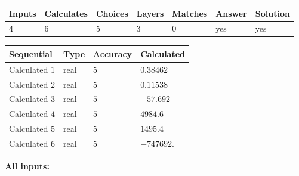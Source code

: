 \documentclass[12pt]{article}
\begin{document}
   
\noindent\begin{tabular}{|l|l|l|l|l|l|l|}
 \hline
Inputs & Calculates & Choices & Layers & Matches & Answer & Solution \\ \hline
           4  & 
           6  & 
           5
  & 
           3  & 
           0  & 
  yes & 
  yes 
  \\ \hline
 \end{tabular}
   
   
   
   
\noindent{}
   
   
  
  
\noindent\begin{tabular}{|l|l|l|l|}
\hline
 Sequential & Type & Accuracy & Calculated \\ 
\hline
 
 
  Calculated $            1 $ & real & $            5  $ & 
 $ 0.38462 $ 
 \\  \hline  
 
 
  Calculated $            2 $ & real & $            5  $ & 
 $ 0.11538 $ 
 \\  \hline  
 
 
  Calculated $            3 $ & real & $            5  $ & 
 $ -57.692 $ 
 \\  \hline  
 
 
  Calculated $            4 $ & real & $            5  $ & 
 $ 4984.6 $ 
 \\  \hline  
 
 
  Calculated $            5 $ & real & $            5  $ & 
 $ 1495.4 $ 
 \\  \hline  
 
 
  Calculated $            6 $ & real & $            5  $ & 
 $ -747692. $ 
 \\  \hline  
 \end{tabular}
   
   
   
   
\noindent\vspace{0.1in}\hspace{-0.08in} {\textbf{\Large{All inputs: }}}
   
   
  
\end{document}
